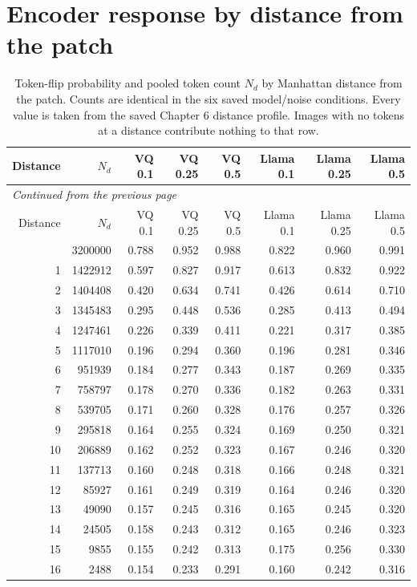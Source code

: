 \pagebreak
\section{Encoder response by distance from the patch}

\begingroup
\small
\setlength{\tabcolsep}{4pt}
\begin{longtable}{rr|rrr|rrr}
\caption[Token-flip probability by Manhattan distance from the perturbed patch]{Token-flip probability and pooled token count $N_d$ by Manhattan distance from the patch. Counts are identical in the six saved model/noise conditions. Every value is taken from the saved Chapter 6 distance profile. Images with no tokens at a distance contribute nothing to that row.}\label{tab:app_encoder_distance}\\
\hline
Distance & $N_d$ & VQ 0.1 & VQ 0.25 & VQ 0.5 & Llama 0.1 & Llama 0.25 & Llama 0.5 \\ \hline
\endfirsthead
\multicolumn{8}{l}{\small\itshape Continued from the previous page}\\
\hline
Distance & $N_d$ & VQ 0.1 & VQ 0.25 & VQ 0.5 & Llama 0.1 & Llama 0.25 & Llama 0.5 \\ \hline
\endhead
\hline
\endfoot
0 & 3200000 & 0.788 & 0.952 & 0.988 & 0.822 & 0.960 & 0.991 \\
1 & 1422912 & 0.597 & 0.827 & 0.917 & 0.613 & 0.832 & 0.922 \\
2 & 1404408 & 0.420 & 0.634 & 0.741 & 0.426 & 0.614 & 0.710 \\
3 & 1345483 & 0.295 & 0.448 & 0.536 & 0.285 & 0.413 & 0.494 \\
4 & 1247461 & 0.226 & 0.339 & 0.411 & 0.221 & 0.317 & 0.385 \\
5 & 1117010 & 0.196 & 0.294 & 0.360 & 0.196 & 0.281 & 0.346 \\
6 & 951939 & 0.184 & 0.277 & 0.343 & 0.187 & 0.269 & 0.335 \\
7 & 758797 & 0.178 & 0.270 & 0.336 & 0.182 & 0.263 & 0.331 \\
8 & 539705 & 0.171 & 0.260 & 0.328 & 0.176 & 0.257 & 0.326 \\
9 & 295818 & 0.164 & 0.255 & 0.324 & 0.169 & 0.250 & 0.321 \\
10 & 206889 & 0.162 & 0.252 & 0.323 & 0.167 & 0.246 & 0.320 \\
11 & 137713 & 0.160 & 0.248 & 0.318 & 0.166 & 0.248 & 0.321 \\
12 & 85927 & 0.161 & 0.249 & 0.319 & 0.164 & 0.246 & 0.320 \\
13 & 49090 & 0.157 & 0.245 & 0.316 & 0.165 & 0.245 & 0.320 \\
14 & 24505 & 0.158 & 0.243 & 0.312 & 0.165 & 0.246 & 0.323 \\
15 & 9855 & 0.155 & 0.242 & 0.313 & 0.175 & 0.256 & 0.330 \\
16 & 2488 & 0.154 & 0.233 & 0.291 & 0.160 & 0.242 & 0.316 \\
\end{longtable}
\endgroup

